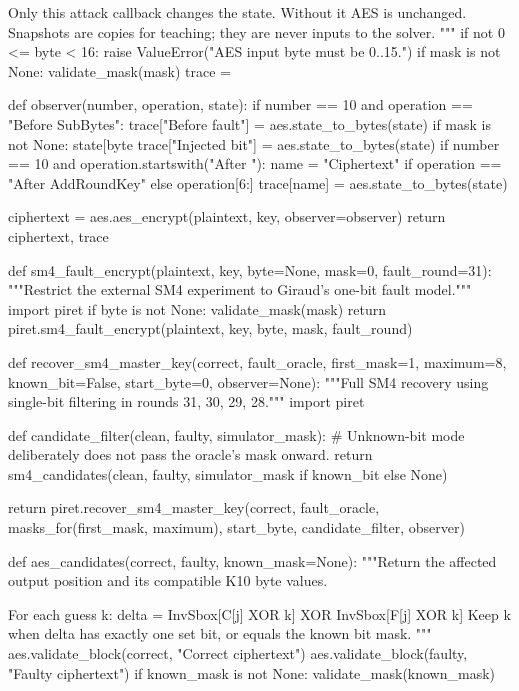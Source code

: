 \begin{lightcode}[numbers=left,firstnumber=1]
    Only this attack callback changes the state. Without it AES is unchanged.
    Snapshots are copies for teaching; they are never inputs to the solver.
    """
    if not 0 <= byte < 16:
        raise ValueError("AES input byte must be 0..15.")
    if mask is not None:
        validate_mask(mask)
    trace = {}

    def observer(number, operation, state):
        if number == 10 and operation == "Before SubBytes":
            trace["Before fault"] = aes.state_to_bytes(state)
            if mask is not None:
                state[byte %
            trace["Injected bit"] = aes.state_to_bytes(state)
        if number == 10 and operation.startswith("After "):
            name = "Ciphertext" if operation == "After AddRoundKey" else operation[6:]
            trace[name] = aes.state_to_bytes(state)

    ciphertext = aes.aes_encrypt(plaintext, key, observer=observer)
    return ciphertext, trace


def sm4_fault_encrypt(plaintext, key, byte=None, mask=0, fault_round=31):
    """Restrict the external SM4 experiment to Giraud's one-bit fault model."""
    import piret
    if byte is not None:
        validate_mask(mask)
    return piret.sm4_fault_encrypt(plaintext, key, byte, mask, fault_round)


def recover_sm4_master_key(correct, fault_oracle, first_mask=1, maximum=8, known_bit=False, start_byte=0, observer=None):
    """Full SM4 recovery using single-bit filtering in rounds 31, 30, 29, 28."""
    import piret

    def candidate_filter(clean, faulty, simulator_mask):
        # Unknown-bit mode deliberately does not pass the oracle's mask onward.
        return sm4_candidates(clean, faulty, simulator_mask if known_bit else None)

    return piret.recover_sm4_master_key(correct, fault_oracle, masks_for(first_mask, maximum), start_byte, candidate_filter, observer)


def aes_candidates(correct, faulty, known_mask=None):
    """Return the affected output position and its compatible K10 byte values.

    For each guess k:
      delta = InvSbox[C[j] XOR k] XOR InvSbox[F[j] XOR k]
    Keep k when delta has exactly one set bit, or equals the known bit mask.
    """
    aes.validate_block(correct, "Correct ciphertext")
    aes.validate_block(faulty, "Faulty ciphertext")
    if known_mask is not None:
        validate_mask(known_mask)


\end{lightcode}

